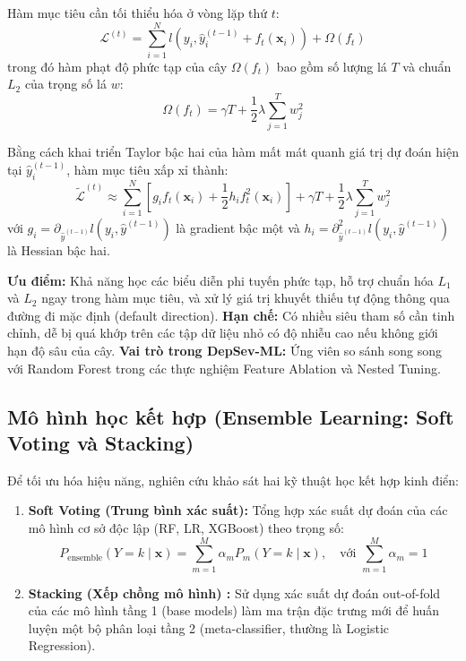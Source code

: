 Hàm mục tiêu cần tối thiểu hóa ở vòng lặp thứ $t$:
\begin{equation}
    \mathcal{L}^{(t)} = \sum_{i=1}^N l(y_i, \hat{y}_i^{(t-1)} + f_t(\mathbf{x}_i)) + \Omega(f_t)
\end{equation}
trong đó hàm phạt độ phức tạp của cây $\Omega(f_t)$ bao gồm số lượng lá $T$ và chuẩn $L_2$ của trọng số lá $w$:
\begin{equation}
    \Omega(f_t) = \gamma T + \frac{1}{2} \lambda \sum_{j=1}^T w_j^2
\end{equation}

Bằng cách khai triển Taylor bậc hai của hàm mất mát quanh giá trị dự đoán hiện tại $\hat{y}_i^{(t-1)}$, hàm mục tiêu xấp xỉ thành:
\begin{equation}
    \tilde{\mathcal{L}}^{(t)} \approx \sum_{i=1}^N \left[ g_i f_t(\mathbf{x}_i) + \frac{1}{2} h_i f_t^2(\mathbf{x}_i) \right] + \gamma T + \frac{1}{2} \lambda \sum_{j=1}^T w_j^2
\end{equation}
với $g_i = \partial_{\hat{y}^{(t-1)}} l(y_i, \hat{y}^{(t-1)})$ là gradient bậc một và $h_i = \partial^2_{\hat{y}^{(t-1)}} l(y_i, \hat{y}^{(t-1)})$ là Hessian bậc hai.

\textbf{Ưu điểm:} Khả năng học các biểu diễn phi tuyến phức tạp, hỗ trợ chuẩn hóa $L_1$ và $L_2$ ngay trong hàm mục tiêu, và xử lý giá trị khuyết thiếu tự động thông qua đường đi mặc định (default direction).  
\textbf{Hạn chế:} Có nhiều siêu tham số cần tinh chỉnh, dễ bị quá khớp trên các tập dữ liệu nhỏ có độ nhiễu cao nếu không giới hạn độ sâu của cây.  
\textbf{Vai trò trong DepSev-ML:} Ứng viên so sánh song song với Random Forest trong các thực nghiệm Feature Ablation và Nested Tuning.

\subsection{Mô hình học kết hợp (Ensemble Learning: Soft Voting và Stacking)}
Để tối ưu hóa hiệu năng, nghiên cứu khảo sát hai kỹ thuật học kết hợp kinh điển:
\begin{enumerate}
    \item \textbf{Soft Voting (Trung bình xác suất):} Tổng hợp xác suất dự đoán của các mô hình cơ sở độc lập (RF, LR, XGBoost) theo trọng số:
    \begin{equation}
        P_{\text{ensemble}}(Y = k \mid \mathbf{x}) = \sum_{m=1}^M \alpha_m P_m(Y = k \mid \mathbf{x}), \quad \text{với } \sum_{m=1}^M \alpha_m = 1
    \end{equation}
    \item \textbf{Stacking (Xếp chồng mô hình) \cite{wolpert1992stacked}:} Sử dụng xác suất dự đoán out-of-fold của các mô hình tầng 1 (base models) làm ma trận đặc trưng mới để huấn luyện một bộ phân loại tầng 2 (meta-classifier, thường là Logistic Regression).
\end{enumerate}

